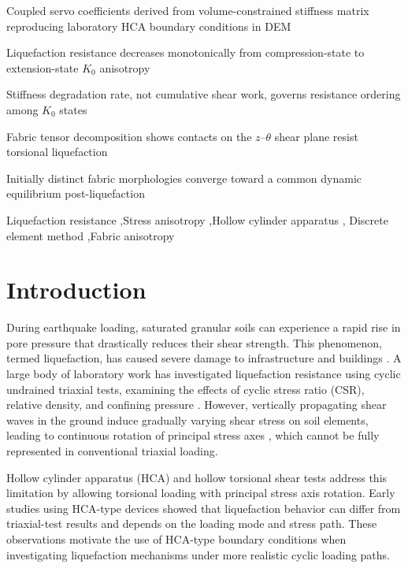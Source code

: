 \documentclass[a4paper,fleqn]{cas-sc}
\newcommand{\Kzero}{\ensuremath{K_0}}
\begin{document}
\begin{highlights}
\item Coupled servo coefficients derived from volume-constrained stiffness matrix reproducing laboratory HCA boundary conditions in DEM
\item Liquefaction resistance decreases monotonically from compression-state to extension-state \Kzero{} anisotropy
\item Stiffness degradation rate, not cumulative shear work, governs resistance ordering among \Kzero{} states
\item Fabric tensor decomposition shows contacts on the $z$--$\theta$ shear plane resist torsional liquefaction
\item Initially distinct fabric morphologies converge toward a common dynamic equilibrium post-liquefaction
\end{highlights}

\begin{keywords}
Liquefaction resistance \sep Stress anisotropy \sep Hollow cylinder apparatus \sep
Discrete element method \sep Fabric anisotropy
\end{keywords}

\maketitle

\section{Introduction}
\label{sec:introduction}

During earthquake loading, saturated granular soils can experience a rapid rise in pore pressure that drastically reduces their shear strength. This phenomenon, termed liquefaction, has caused severe damage to infrastructure and buildings \citep{IshiharaKoga1981,SeedIdriss1967}. A large body of laboratory work has investigated liquefaction resistance using cyclic undrained triaxial tests, examining the effects of cyclic stress ratio (CSR), relative density, and confining pressure \citep{Hyodo1991,SeedLee1966,Silver1976,Toki1986}. However, vertically propagating shear waves in the ground induce gradually varying shear stress on soil elements, leading to continuous rotation of principal stress axes \citep{Arthur1980,IshiharaTowhata1983}, which cannot be fully represented in conventional triaxial loading.

Hollow cylinder apparatus (HCA) and hollow torsional shear tests address this limitation by allowing torsional loading with principal stress axis rotation. Early studies using HCA-type devices \citep[e.g.,][]{IshiharaYasuda1975,Tatsuoka1986,YamashitaToki1993} showed that liquefaction behavior can differ from triaxial-test results and depends on the loading mode and stress path. These observations motivate the use of HCA-type boundary conditions when investigating liquefaction mechanisms under more realistic cyclic loading paths.
\end{document}
